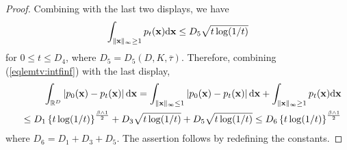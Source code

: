 \documentclass[twoside,11pt]{article}
\newcommand{\bx}{{\bf x}}
\newcommand{\bbR}{{\mathbb R}}
\newcommand{\bean}{\setlength\arraycolsep{1pt}\begin{eqnarray*}}
\newcommand{\eean}{\end{eqnarray*}}
\def\d{{\rm d}}
\begin{document}
\begin{proof}
Combining with the last two displays, we have
\bean
\int_{ \|\bx\|_{\infty} \geq 1 } p_t(\bx) \d \bx 
\leq D_{5} \sqrt{t \log (1/t) }
\eean
for $0 \leq t \leq D_{4}$, where $D_{5} = D_{5}(D,K,\overline{\tau})$.
Therefore, combining (\ref{eqlemtv:intfinf}) with the last display, 
 \bean
&& \int_{\bbR^{D}} \left\vert p_0(\bx) - p_t(\bx) \right\vert \d \bx = \int_{\| \bx \|_{\infty} \leq 1} \left\vert p_0(\bx) - p_t(\bx) \right\vert \d \bx
+ \int_{\| \bx \|_{\infty} \geq 1}  p_t(\bx) \d \bx
\\
&& \leq  D_{1}  \left\{ t \log (1/t) \right\}^{\frac{\beta \wedge 1}{2}} + D_{3} \sqrt{t \log (1/t)} + D_{5} \sqrt{t \log (1/t) } \leq D_{6} \left\{ t \log (1/t) \right\}^{\frac{\beta \wedge 1}{2}} 
\eean
where $D_{6} = D_1 + D_3 + D_5 $.
The assertion follows by redefining the constants.

\end{proof}
\end{document}
